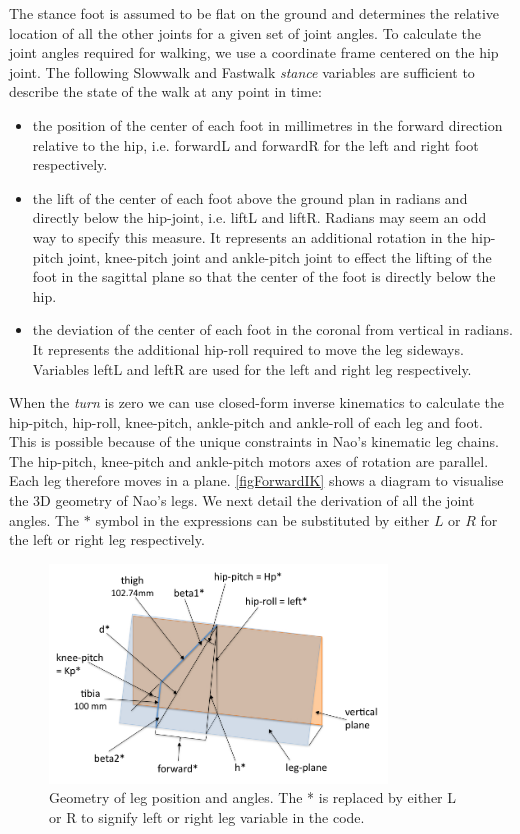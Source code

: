 \documentclass[pdftex,11pt,a4paper]{report}
\begin{document}
The stance foot is assumed to be flat on the ground and determines the relative location of all the other joints for a given set of  joint angles. To calculate the joint angles required for walking, we use a coordinate frame centered on the hip joint. The following Slowwalk and Fastwalk \emph{stance} variables are sufficient to describe the state of the walk at any point in time:
\begin{itemize}
\item the position of the center of  each foot in millimetres in the forward direction relative to the hip, i.e. forwardL and forwardR for the left and right foot respectively.
\item the lift of the center of each foot above the ground plan in radians and directly below the hip-joint, i.e. liftL and liftR. Radians may seem an odd way to specify this measure. It represents an additional rotation in the hip-pitch joint, knee-pitch joint and ankle-pitch joint to effect the lifting of the foot in the sagittal plane so that the center of the foot is directly below the hip. 
\item the deviation of the center of each foot in the coronal from vertical in radians. It represents the additional hip-roll required to move the leg sideways. Variables leftL and leftR are used for the left and right leg respectively. 
\end{itemize}

When the \emph{turn} is zero we can use closed-form inverse kinematics to calculate the hip-pitch, hip-roll, knee-pitch, ankle-pitch and ankle-roll of each leg and foot. This is possible because of the unique constraints in Nao's kinematic leg chains. The hip-pitch, knee-pitch and ankle-pitch motors axes of rotation are parallel. Each leg therefore moves in a plane. \autoref{figForwardIK} shows a diagram to visualise the 3D geometry of Nao's legs. We next detail the derivation of all the joint angles. The $*$ symbol in the expressions can be substituted by either $L$ or $R$ for the left or right leg respectively. 
 
\begin{figure} [ht]
\centering
\includegraphics[width=0.8\textwidth]{figures/forwardIK.jpg}
\caption{Geometry of leg position and angles. The * is replaced by either L or R to signify left or right leg variable in the code.} \label{figForwardIK}
\end{figure}
\end{document}

